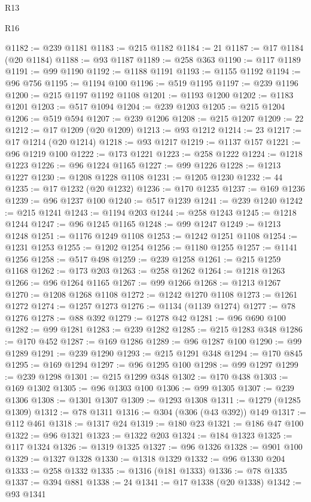 \begin{lexlean}{R13}
\begin{lexlean}{R16}
\begin{coremodule}
{{{{{{{{{{{{{{{{{{{{{{{{{{{{{{{{{{{{{{{{{{{{{{{{{{{{{{{{{{{{{{{{{{{{{{{{{{{{{{{{{{{{{{{{{{{{{{{{{{{{{{{{{{{{{{{{{@1182 := @239 @1181
@1183 := @215 @1182
@1184 := 21
@1187 := @17 @1184 (@20 @1184)
@1188 := @93 @1187
@1189 := @258 @363
@1190 := @117 @1189
@1191 := @99 @1190
@1192 := @1188 @1191
@1193 := @1155 @1192
@1194 := @96 @756
@1195 := @1194 @100
@1196 := @519 @1195
@1197 := @239 @1196
@1200 := @215 @1197 @1192 @1108
@1201 := @1193 @1200
@1202 := @1183 @1201
@1203 := @517 @1094
@1204 := @239 @1203
@1205 := @215 @1204
@1206 := @519 @594
@1207 := @239 @1206
@1208 := @215 @1207
@1209 := 22
@1212 := @17 @1209 (@20 @1209)
@1213 := @93 @1212
@1214 := 23
@1217 := @17 @1214 (@20 @1214)
@1218 := @93 @1217
@1219 := @1137 @157
@1221 := @96 @1219 @100
@1222 := @173 @1221
@1223 := @258 @1222
@1224 := @1218 @1223
@1226 := @96 @1224 @1165
@1227 := @99 @1226
@1228 := @1213 @1227
@1230 := @1208 @1228 @1108
@1231 := @1205 @1230
@1232 := 44
@1235 := @17 @1232 (@20 @1232)
@1236 := @170 @1235
@1237 := @169 @1236
@1239 := @96 @1237 @100
@1240 := @517 @1239
@1241 := @239 @1240
@1242 := @215 @1241
@1243 := @1194 @203
@1244 := @258 @1243
@1245 := @1218 @1244
@1247 := @96 @1245 @1165
@1248 := @99 @1247
@1249 := @1213 @1248
@1251 := @1176 @1249 @1108
@1253 := @1242 @1251 @1108
@1254 := @1231 @1253
@1255 := @1202 @1254
@1256 := @1180 @1255
@1257 := @1141 @1256
@1258 := @517 @498
@1259 := @239 @1258
@1261 := @215 @1259 @1168
@1262 := @173 @203
@1263 := @258 @1262
@1264 := @1218 @1263
@1266 := @96 @1264 @1165
@1267 := @99 @1266
@1268 := @1213 @1267
@1270 := @1208 @1268 @1108
@1272 := @1242 @1270 @1108
@1273 := @1261 @1272
@1274 := @1257 @1273
@1276 := @1134 (@1139 @1274)
@1277 := @78 @1276
@1278 := @88 @392
@1279 := @1278 @42
@1281 := @96 @690 @100
@1282 := @99 @1281
@1283 := @239 @1282
@1285 := @215 @1283 @348
@1286 := @170 @452
@1287 := @169 @1286
@1289 := @96 @1287 @100
@1290 := @99 @1289
@1291 := @239 @1290
@1293 := @215 @1291 @348
@1294 := @170 @845
@1295 := @169 @1294
@1297 := @96 @1295 @100
@1298 := @99 @1297
@1299 := @239 @1298
@1301 := @215 @1299 @348
@1302 := @170 @438
@1303 := @169 @1302
@1305 := @96 @1303 @100
@1306 := @99 @1305
@1307 := @239 @1306
@1308 := @1301 @1307
@1309 := @1293 @1308
@1311 := @1279 (@1285 @1309)
@1312 := @78 @1311
@1316 := @304 (@306 (@43 @392)) @149
@1317 := @112 @461
@1318 := @1317 @24
@1319 := @180 @23
@1321 := @186 @47 @100
@1322 := @96 @1321
@1323 := @1322 @203
@1324 := @184 @1323
@1325 := @117 @1324
@1326 := @1319 @1325
@1327 := @96 @1326
@1328 := @901 @100
@1329 := @1327 @1328
@1330 := @1318 @1329
@1332 := @96 @1330 @204
@1333 := @258 @1332
@1335 := @1316 (@181 @1333)
@1336 := @78 @1335
@1337 := @394 @881
@1338 := 24
@1341 := @17 @1338 (@20 @1338)
@1342 := @93 @1341
}}}}}}}}}}}}}}}}}}}}}}}}}}}}}}}}}}}}}}}}}}}}}}}}}}}}}}}}}}}}}}}}}}}}}}}}}}}}}}}}}}}}}}}}}}}}}}}}}}}}}}}}}}}}}}}}}
\end{coremodule}
\end{lexlean}
\end{lexlean}
